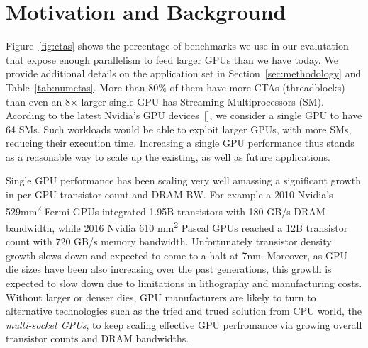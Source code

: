 \section{Motivation and Background}
\label{background}

Figure~\ref{fig:ctas} shows the percentage of benchmarks we use in our evalutation that expose enough parallelism to feed larger GPUs than we have today. We provide additional details on the application set in Section~\ref{sec:methodology} and Table~\ref{tab:numctas}. More than 80\% of them have more CTAs (threadblocks) than even an 8$\times$ larger single GPU has Streaming Multiprocessors (SM). Acording to the latest Nvidia's GPU devices~\ref{}, we consider a single GPU to have 64 SMs. Such workloads would be able to exploit larger GPUs, with more SMs, reducing their execution time. Increasing a single GPU performance thus stands as a reasonable way to scale up the existing, as well as future applications.

Single GPU performance has been scaling very well amassing a significant
growth in per-GPU transistor count and DRAM BW. For example a 2010 Nvidia's
529mm\textsuperscript{2} Fermi GPUs integrated 1.95B transistors with 180 GB/s
DRAM bandwidth, while 2016 Nvidia 610 mm\textsuperscript{2} Pascal GPUs reached
a 12B transistor count with 720 GB/s memory bandwidth. Unfortunately transistor density
growth slows down and expected to come to a halt at 7nm. Moreover, as GPU die sizes
have been also increasing over the past generations, this growth is expected to
slow down due to limitations in lithography and manufacturing costs. 
Without larger or denser dies, GPU manufacturers are likely to turn to 
alternative technologies such as the tried and trued solution from CPU world,
the \textit{multi-socket GPUs}, to keep scaling effective GPU perfromance via 
growing overall transistor counts and DRAM bandwidths. 


